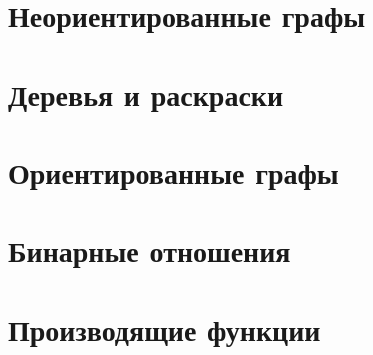 \documentclass[12pt]{article}
\begin{document}
	\section{Неориентированные графы}
	\section{Деревья и раскраски}
	\section{Ориентированные графы}
	\section{Бинарные отношения}
	\section{Производящие функции}
	
\end{document}

